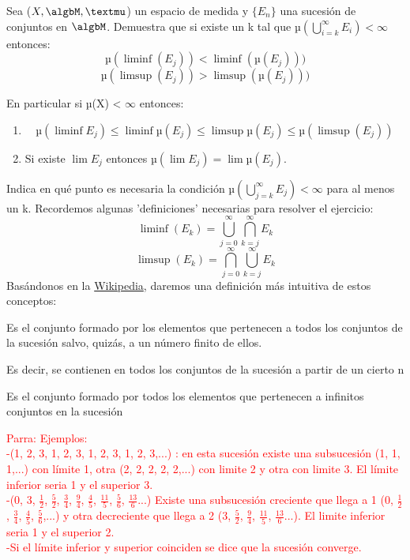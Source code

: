 \begin{problem}[6]
Sea ($X, \algbM, µ$) un espacio de medida y $\{E_n\} $ una sucesión de conjuntos en $\algbM$. Demuestra que si existe un k tal que $µ(\bigcup_{i=k}^{\infty}E_i) < \infty$ entonces:
\[µ(\liminf (E_j))<\liminf (µ(E_j)))\]
\[µ(\limsup (E_j))>\limsup (µ(E_j)))\]

En particular si µ(X) < $\infty$ entonces:
\begin{enumerate}
\item
\[µ(\liminf E_j) \leq \liminf µ(E_j) \leq \limsup µ(E_j) \leq µ(\limsup(E_j))\]
\item Si existe $\lim E_j$ entonces $µ(\lim E_j)=\lim µ(E_j)$.
\end{enumerate}
Indica en qué punto es necesaria la condición $µ(\bigcup_{j=k}^{\infty}E_j)< \infty$ para al menos un k.
\solution
Recordemos algunas 'definiciones' necesarias para resolver el ejercicio:
\[\liminf (E_k) = \bigcup_{j=0}^{\infty} \bigcap_{k=j}^{\infty} E_k\]
\[\limsup (E_k)= \bigcap_{j=0}^{\infty} \bigcup_{k=j}^{\infty} E_k\]
Basándonos en la \href{http://en.wikipedia.org/wiki/Limit_superior_and_limit_inferior}{Wikipedia}, daremos una definición más intuitiva de estos conceptos:

\begin{defn}
Es el conjunto formado por los elementos que pertenecen a todos los conjuntos de la sucesión salvo, quizás, a un número finito de ellos.

Es decir, se contienen en todos los conjuntos de la sucesión a partir de un cierto n
\end{defn}

\begin{defn}
Es el conjunto formado por todos los elementos que pertenecen a infinitos conjuntos en la sucesión
\end{defn}

\textcolor{red}{Parra: Ejemplos:\\
-(1, 2, 3, 1, 2, 3, 1, 2, 3, 1, 2, 3,...) : en esta sucesión existe una subsucesión (1, 1, 1,...) con límite 1, otra (2, 2, 2, 2, 2,...) con limite 2 y otra con limite 3. El límite inferior seria 1 y el superior 3.\\
-(0, 3, $\frac{1}{2}$, $\frac{5}{2}$, $\frac{3}{4}$, $\frac{9}{4}$, $\frac{4}{5}$, $\frac{11}{5}$, $\frac{5}{6}$, $\frac{13}{6}$...) Existe una subsucesión creciente que llega a 1 (0, $\frac{1}{2}$, $\frac{3}{4}$, $\frac{4}{5}$, $\frac{5}{6}$,...) y otra decreciente que llega a 2 (3, $\frac{5}{2}$, $\frac{9}{4}$, $\frac{11}{5}$, $\frac{13}{6}$...). El limite inferior seria 1 y el superior 2.\\
-Si el límite inferior y superior coinciden se dice que la sucesión converge.}


\end{problem}
